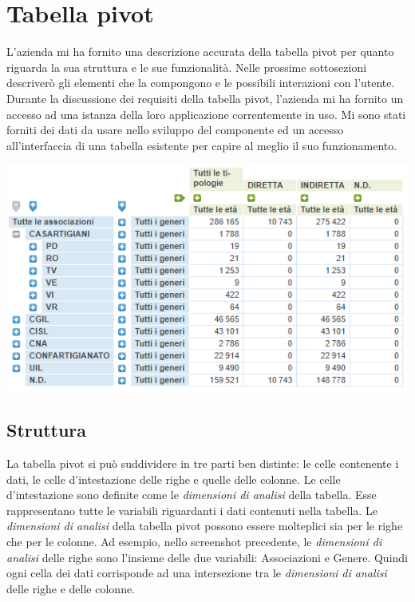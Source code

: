\section{Tabella pivot}
L'azienda mi ha fornito una descrizione accurata della tabella pivot per quanto riguarda la sua struttura e le sue funzionalità. Nelle prossime sottosezioni descriverò gli elementi che la compongono e le possibili interazioni con l'utente. \\
Durante la discussione dei requisiti della tabella pivot, l'azienda mi ha fornito un accesso ad una istanza della loro applicazione correntemente in uso. Mi sono stati forniti dei dati da usare nello sviluppo del componente ed un accesso all'interfaccia di una tabella esistente per capire al meglio il suo funzionamento. \\
\begin{minipage}{\linewidth}
\includegraphics[scale=0.75]{./immagini/tabella-pivot-old.png}
\end{minipage}

\subsection{Struttura}
La tabella pivot si può suddividere in tre parti ben distinte: le celle contenente i dati, le celle d'intestazione delle righe e quelle delle colonne. 
Le celle d'intestazione sono definite come le \emph{dimensioni di analisi} della tabella. Esse rappresentano tutte le variabili riguardanti i dati contenuti nella tabella. Le \emph{dimensioni di analisi} della tabella pivot possono essere molteplici sia per le righe che per le colonne. Ad esempio, nello screenshot precedente, le \emph{dimensioni di analisi} delle righe sono l'insieme delle due variabili: Associazioni e Genere. Quindi ogni cella dei dati corrisponde ad una intersezione tra le \emph{dimensioni di analisi} delle righe e delle colonne.

